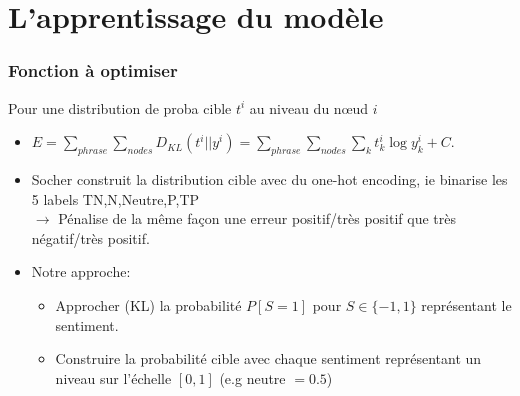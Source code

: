 \documentclass{beamer}
\begin{document}
\section{L'apprentissage du modèle}

\begin{frame}
\frametitle{Fonction à optimiser}
Pour une distribution de proba cible $t^i$ au niveau du nœud $i$
\begin{itemize}\setlength{\itemsep}{4mm}
\item $ \displaystyle   E = \sum_{phrase}\sum_{nodes} D_{KL}(t^i||y^i)=\sum_{phrase}\sum_{nodes}\sum_{k}t^i_k \log y^i_k +C$.
\item Socher construit la distribution cible avec du one-hot encoding, ie binarise les 5 labels TN,N,Neutre,P,TP\\
$\rightarrow$ Pénalise de la même façon une erreur positif/très positif que très négatif/très positif.
\item Notre approche: 
\begin{itemize}
\item Approcher (KL) la probabilité $P[S=1]$ pour $S\in\{-1,1\}$ représentant le sentiment.
\item Construire la probabilité cible avec chaque sentiment représentant un niveau sur l'échelle $[0,1]$ (e.g neutre $=0.5$)
\end{itemize}
\end{itemize}
\end{frame}

\end{document}
